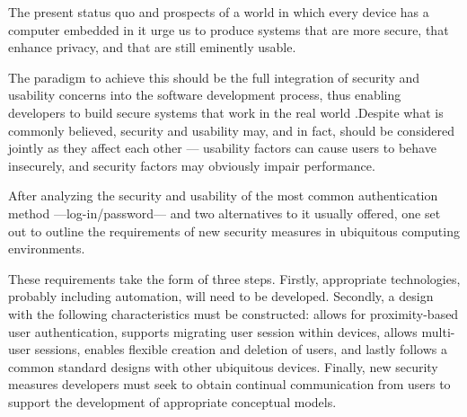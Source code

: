 \documentclass{article}
\begin{document}
The present status quo and prospects of a world in which every device has a computer embedded in it urge us to produce systems that are more secure, that enhance privacy, and that are still eminently usable. 

The paradigm to achieve this should be the full integration of security and usability concerns into the software development process, thus enabling developers to build secure systems that work in the real world \cite{flechais2003bringing}.Despite what is commonly believed, security and usability may, and in fact, should be considered jointly as they affect each other --- usability factors can cause users to behave insecurely, and security factors may obviously impair performance.

After analyzing the security and usability of the most common authentication method ---log-in/password--- and two alternatives to it usually offered, one set out to outline the requirements of new security measures in ubiquitous computing environments.

These requirements take the form of three steps. Firstly, appropriate technologies, probably including automation, will need to be developed. Secondly, a design with the following characteristics must be constructed: allows for proximity-based user authentication, supports migrating user session within devices, allows multi-user sessions, enables flexible creation and deletion of users, and lastly follows a common standard designs with other ubiquitous devices. Finally, new security measures developers must seek to obtain continual communication from users to support the development of appropriate conceptual models.



\end{document}
